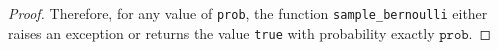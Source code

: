 \documentclass[11pt,a4paper]{article}
\theoremstyle{definition}
\begin{document}
\begin{proof}
\noindent Therefore, for any value of \texttt{prob}, the function \texttt{sample\_bernoulli} either raises an exception or returns the value \texttt{true} with probability exactly $\texttt{prob}$.  
\end{proof}






\end{document}
